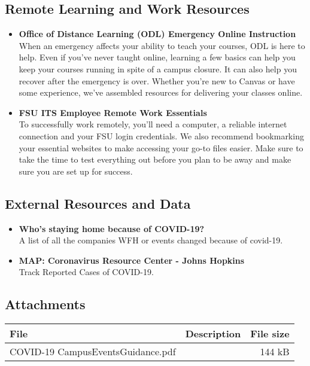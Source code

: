 \documentclass[12pt,a4paper]{article}
\begin{document}
\subsection{Remote Learning and Work Resources}
\begin{itemize}
    \item \textbf{Office of Distance Learning (ODL) Emergency Online Instruction} \\
    When an emergency affects your ability to teach your courses, ODL is here to help. Even if you've never taught online, learning a few basics can help you keep your courses running in spite of a campus closure. It can also help you recover after the emergency is over. Whether you're new to Canvas or have some experience, we've assembled resources for delivering your classes online.
    
    \item \textbf{FSU ITS Employee Remote Work Essentials} \\
    To successfully work remotely, you’ll need a computer, a reliable internet connection and your FSU login credentials. We also recommend bookmarking your essential websites to make accessing your go-to files easier. Make sure to take the time to test everything out before you plan to be away and make sure you are set up for success.
\end{itemize}

\subsection{External Resources and Data}
\begin{itemize}
    \item \textbf{Who’s staying home because of COVID-19?} \\
    A list of all the companies WFH or events changed because of covid-19.
    
    \item \textbf{MAP: Coronavirus Resource Center - Johns Hopkins} \\
    Track Reported Cases of COVID-19.
\end{itemize}

\subsection{Attachments}
\begin{center}
\begin{tabular}{p{6cm} p{6cm} r}
\hline
\textbf{File} & \textbf{Description} & \textbf{File size} \\
\hline
COVID-19 CampusEventsGuidance.pdf & & 144 kB \\
\hline
\end{tabular}
\end{center}
\end{document}
